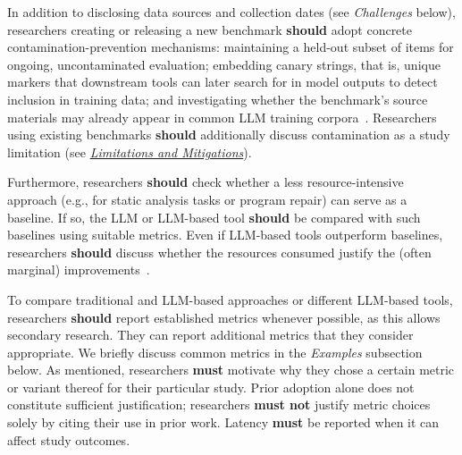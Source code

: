 \documentclass[smallextended]{svjour3}
\newcommand{\must}{\textbf{must}\xspace}
\newcommand{\mustnot}{\textbf{must not}\xspace}
\newcommand{\should}{\textbf{should}\xspace}
\newcommand{\limitationsmitigations}{\hyperref[sec:report-limitations-and-mitigations]{\emph{Limitations and Mitigations}}\xspace}
\newcommand{\limitationsmitigations}{\href{/guidelines/limitations/}{\emph{Limitations and Mitigations}}\xspace}
\begin{document}
In addition to disclosing data sources and collection dates (see \emph{Challenges} below), researchers creating or releasing a new benchmark \should adopt concrete contamination-prevention mechanisms: maintaining a held-out subset of items for ongoing, uncontaminated evaluation; embedding canary strings, that is, unique markers that downstream tools can later search for in model outputs to detect inclusion in training data; and investigating whether the benchmark's source materials may already appear in common LLM training corpora~\cite{bean2025measuring, cao2025should}. Researchers using existing benchmarks \should additionally discuss contamination as a study limitation (see \limitationsmitigations).

Furthermore, researchers \should check whether a less resource-intensive approach (e.g., for static analysis tasks or program repair) can serve as a baseline. If so, the LLM or LLM-based tool \should be compared with such baselines using suitable metrics. Even if LLM-based tools outperform baselines, researchers \should discuss whether the resources consumed justify the (often marginal) improvements~\cite{DBLP:journals/cacm/Menzies25}.

To compare traditional and LLM-based approaches or different LLM-based tools, researchers \should report established metrics whenever possible, as this allows secondary research.
They can report additional metrics that they consider appropriate.
We briefly discuss common metrics in the \emph{Examples} subsection below.
As mentioned, researchers \must motivate why they chose a certain metric or variant thereof for their particular study.
Prior adoption alone does not constitute sufficient justification; researchers \mustnot justify metric choices solely by citing their use in prior work.
Latency \must be reported when it can affect study outcomes.
\end{document}
